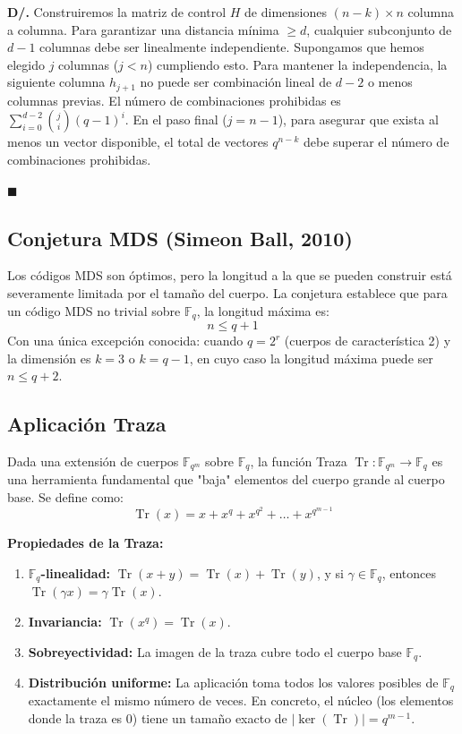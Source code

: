 \documentclass{article}
\begin{document}
\noindent\textbf{D/. }
    Construiremos la matriz de control $H$ de dimensiones $(n-k) \times n$ columna a columna. Para garantizar una distancia mínima $\ge d$, cualquier subconjunto de $d-1$ columnas debe ser linealmente independiente. Supongamos que hemos elegido $j$ columnas ($j < n$) cumpliendo esto. Para mantener la independencia, la siguiente columna $h_{j+1}$ no puede ser combinación lineal de $d-2$ o menos columnas previas. El número de combinaciones prohibidas es $\sum_{i=0}^{d-2} \binom{j}{i}(q-1)^i$. En el paso final ($j=n-1$), para asegurar que exista al menos un vector disponible, el total de vectores $q^{n-k}$ debe superar el número de combinaciones prohibidas.
    
 \noindent$\blacksquare$


\subsection{Conjetura MDS (Simeon Ball, 2010)}
Los códigos MDS son óptimos, pero la longitud a la que se pueden construir está severamente limitada por el tamaño del cuerpo. La conjetura establece que para un código MDS no trivial sobre $\mathbb{F}_q$, la longitud máxima es:
\[n \le q+1\]
Con una única excepción conocida: cuando $q = 2^r$ (cuerpos de característica 2) y la dimensión es $k=3$ o $k=q-1$, en cuyo caso la longitud máxima puede ser $n \le q+2$.

\subsection{Aplicación Traza}
Dada una extensión de cuerpos $\mathbb{F}_{q^m}$ sobre $\mathbb{F}_q$, la función Traza $\operatorname{Tr}: \mathbb{F}_{q^m} \to \mathbb{F}_q$ es una herramienta fundamental que "baja" elementos del cuerpo grande al cuerpo base. Se define como:
\[\operatorname{Tr}(x) = x + x^q + x^{q^2} + \dots + x^{q^{m-1}}\]

\textbf{Propiedades de la Traza:}
\begin{enumerate}
\item \textbf{$\mathbb{F}_q$-linealidad:} $\operatorname{Tr}(x+y) = \operatorname{Tr}(x) + \operatorname{Tr}(y)$, y si $\gamma \in \mathbb{F}_q$, entonces $\operatorname{Tr}(\gamma x) = \gamma \operatorname{Tr}(x)$.
\item \textbf{Invariancia:} $\operatorname{Tr}(x^q) = \operatorname{Tr}(x)$.
\item \textbf{Sobreyectividad:} La imagen de la traza cubre todo el cuerpo base $\mathbb{F}_q$.
\item \textbf{Distribución uniforme:} La aplicación toma todos los valores posibles de $\mathbb{F}_q$ exactamente el mismo número de veces. En concreto, el núcleo (los elementos donde la traza es 0) tiene un tamaño exacto de $|\ker(\operatorname{Tr})| = q^{m-1}$.
\end{enumerate}
\end{document}
